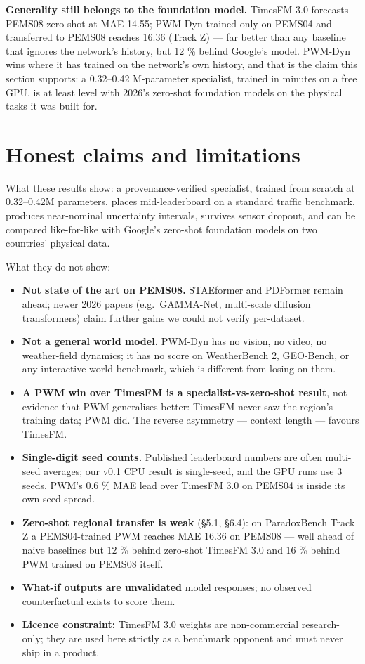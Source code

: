 \documentclass[
  10pt,
]{article}
\providecommand{\tightlist}{%
  \setlength{\itemsep}{0pt}\setlength{\parskip}{0pt}}
\begin{document}
\textbf{Generality still belongs to the foundation model.} TimesFM 3.0
forecasts PEMS08 zero-shot at MAE 14.55; PWM-Dyn trained only on PEMS04
and transferred to PEMS08 reaches 16.36 (Track Z) --- far better than
any baseline that ignores the network's history, but 12 \% behind
Google's model. PWM-Dyn wins where it has trained on the network's own
history, and that is the claim this section supports: a 0.32--0.42 M-parameter
specialist, trained in minutes on a free GPU, is at least level with
2026's zero-shot foundation models on the physical tasks it was built
for.

\section{Honest claims and limitations}

What these results show: a provenance-verified specialist, trained from
scratch at 0.32--0.42M parameters, places mid-leaderboard on a standard traffic
benchmark, produces near-nominal uncertainty intervals, survives sensor
dropout, and can be compared like-for-like with Google's zero-shot
foundation models on two countries' physical data.

What they do not show:

\begin{itemize}
\tightlist
\item
  \textbf{Not state of the art on PEMS08.} STAEformer and PDFormer
  remain ahead; newer 2026 papers (e.g.~GAMMA-Net, multi-scale diffusion
  transformers) claim further gains we could not verify per-dataset.
\item
  \textbf{Not a general world model.} PWM-Dyn has no vision, no video,
  no weather-field dynamics; it has no score on WeatherBench 2,
  GEO-Bench, or any interactive-world benchmark, which is different from
  losing on them.
\item
  \textbf{A PWM win over TimesFM is a specialist-vs-zero-shot result},
  not evidence that PWM generalises better: TimesFM never saw the
  region's training data; PWM did. The reverse asymmetry --- context
  length --- favours TimesFM.
\item
  \textbf{Single-digit seed counts.} Published leaderboard numbers are
  often multi-seed averages; our v0.1 CPU result is single-seed, and the
  GPU runs use 3 seeds. PWM's 0.6 \% MAE lead over TimesFM 3.0 on PEMS04
  is inside its own seed spread.
\item
  \textbf{Zero-shot regional transfer is weak} (§5.1, §6.4): on
  ParadoxBench Track Z a PEMS04-trained PWM reaches MAE 16.36 on PEMS08
  --- well ahead of naive baselines but 12 \% behind zero-shot TimesFM
  3.0 and 16 \% behind PWM trained on PEMS08 itself.
\item
  \textbf{What-if outputs are unvalidated} model responses; no observed
  counterfactual exists to score them.
\item
  \textbf{Licence constraint:} TimesFM 3.0 weights are non-commercial
  research-only; they are used here strictly as a benchmark opponent and
  must never ship in a product.
\end{itemize}
\end{document}
